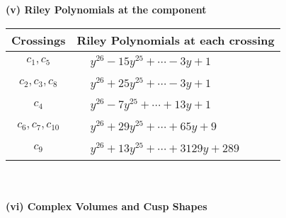 \documentclass[1p]{elsarticle_modified}
\theoremstyle{definition}
\begin{document}
\flushleft \textbf{(v) Riley Polynomials at the component}\newline \\
\begin{tabular}{m{50pt}|m{274pt}}
Crossings & \hspace{64pt}Riley Polynomials at each crossing \\
\hline $$\begin{aligned}c_{1},c_{5}\end{aligned}$$&$\begin{aligned}
&y^{26}-15 y^{25}+\cdots-3 y+1
\end{aligned}$\\
\hline $$\begin{aligned}c_{2},c_{3},c_{8}\end{aligned}$$&$\begin{aligned}
&y^{26}+25 y^{25}+\cdots-3 y+1
\end{aligned}$\\
\hline $$\begin{aligned}c_{4}\end{aligned}$$&$\begin{aligned}
&y^{26}-7 y^{25}+\cdots+13 y+1
\end{aligned}$\\
\hline $$\begin{aligned}c_{6},c_{7},c_{10}\end{aligned}$$&$\begin{aligned}
&y^{26}+29 y^{25}+\cdots+65 y+9
\end{aligned}$\\
\hline $$\begin{aligned}c_{9}\end{aligned}$$&$\begin{aligned}
&y^{26}+13 y^{25}+\cdots+3129 y+289
\end{aligned}$\\
\hline
\end{tabular}\\~\\
\newpage\flushleft \textbf{(vi) Complex Volumes and Cusp Shapes}
\end{document}
